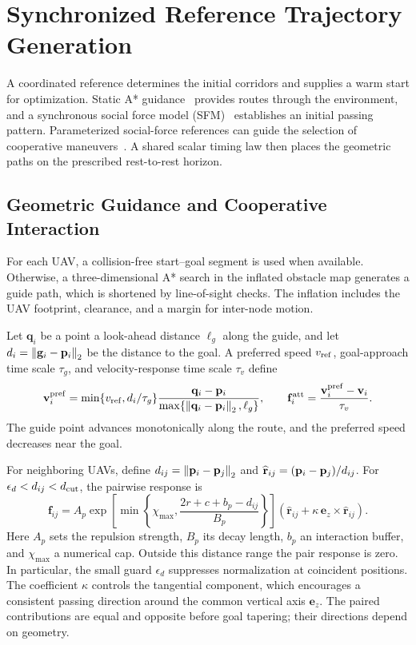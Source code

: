 \section{Synchronized Reference Trajectory Generation}
\label{sec:initialization}
A coordinated reference determines the initial corridors and supplies a warm start for optimization. Static A* guidance~\cite{hart1968} provides routes through the environment, and a synchronous social force model (SFM)~\cite{helbing1995} establishes an initial passing pattern. Parameterized social-force references can guide the selection of cooperative maneuvers~\cite{li2023priority}. A shared scalar timing law then places the geometric paths on the prescribed rest-to-rest horizon.

\subsection{Geometric Guidance and Cooperative Interaction}
For each UAV, a collision-free start--goal segment is used when available. Otherwise, a three-dimensional A* search in the inflated obstacle map generates a guide path, which is shortened by line-of-sight checks. The inflation includes the UAV footprint, clearance, and a margin for inter-node motion.

Let $\mathbf q_i$ be a point a look-ahead distance $\ell_g$ along the guide, and let $d_i=\left\lVert \mathbf g_i-\mathbf{p}_i\right\rVert_2$ be the distance to the goal. A preferred speed $v_{\rm ref}$, goal-approach time scale $\tau_g$, and velocity-response time scale $\tau_v$ define
\begin{equation}
 \mathbf{v}_i^{\rm pref}=\min\{v_{\rm ref},d_i/\tau_g\}
 \frac{\mathbf q_i-\mathbf{p}_i}{\max\{\left\lVert \mathbf q_i-\mathbf{p}_i\right\rVert_2,\ell_g\}},
 \qquad \mathbf f_i^{\rm att}=\frac{\mathbf{v}_i^{\rm pref}-\mathbf{v}_i}{\tau_v}.
 \label{eq:attraction}
\end{equation}
The guide point advances monotonically along the route, and the preferred speed decreases near the goal.

For neighboring UAVs, define $d_{ij}=\left\lVert \mathbf{p}_i-\mathbf{p}_j\right\rVert_2$ and $\widehat{\mathbf r}_{ij}=(\mathbf{p}_i-\mathbf{p}_j)/d_{ij}$. For $\epsilon_d<d_{ij}<d_{\rm cut}$, the pairwise response is
\begin{equation}
 \mathbf f_{ij}=A_p\exp\!\left[
 \min\left\{\chi_{\max},\frac{2r+c+b_p-d_{ij}}{B_p}\right\}\right]
 \left(\widehat{\mathbf r}_{ij}+\kappa\,\mathbf e_z\times\widehat{\mathbf r}_{ij}\right).
 \label{eq:repulsion}
\end{equation}
Here $A_p$ sets the repulsion strength, $B_p$ its decay length, $b_p$ an interaction buffer, and $\chi_{\max}$ a numerical cap. Outside this distance range the pair response is zero. In particular, the small guard $\epsilon_d$ suppresses normalization at coincident positions. The coefficient $\kappa$ controls the tangential component, which encourages a consistent passing direction around the common vertical axis $\mathbf e_z$. The paired contributions are equal and opposite before goal tapering; their directions depend on geometry.

